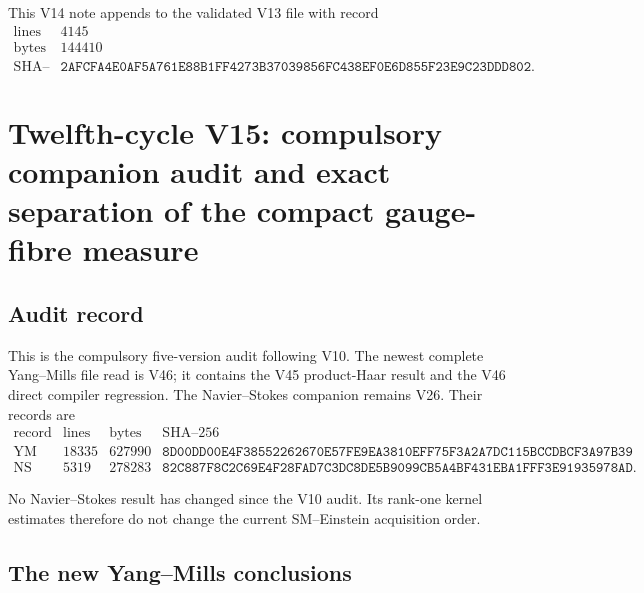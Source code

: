 \documentclass[11pt]{article}
\theoremstyle{remark}
\begin{document}
This V14 note appends to the validated V13 file with record
\[
\begin{array}{c|c}
\text{lines}&4145\\
\text{bytes}&144410\\
\text{SHA--256}&
\texttt{2AFCFA4E0AF5A761E88B1FF4273B37039856FC438EF0E6D855F23E9C23DDD802}.
\end{array}
\]


\section{Twelfth-cycle V15: compulsory companion audit and exact
separation of the compact gauge-fibre measure}
\label{sec:v12v15}

\subsection{Audit record}

This is the compulsory five-version audit following V10.  The newest
complete Yang--Mills file read is V46; it contains the V45
product-Haar result and the V46 direct compiler regression.  The
Navier--Stokes companion remains V26.  Their records are
\[
\begin{array}{c|r|r|c}
\text{record}&\text{lines}&\text{bytes}&\text{SHA--256}\\ \hline
\text{YM V46}&18335&627990&
\texttt{8D00DD00E4F38552262670E57FE9EA3810EFF75F3A2A7DC115BCCDBCF3A97B39}\\
\text{NS V26}&5319&278283&
\texttt{82C887F8C2C69E4F28FAD7C3DC8DE5B9099CB5A4BF431EBA1FFF3E91935978AD}.
\end{array}                                                   \tag{15.1}
\]

No Navier--Stokes result has changed since the V10 audit.  Its
rank-one kernel estimates therefore do not change the current
SM--Einstein acquisition order.

\subsection{The new Yang--Mills conclusions}
\end{document}
